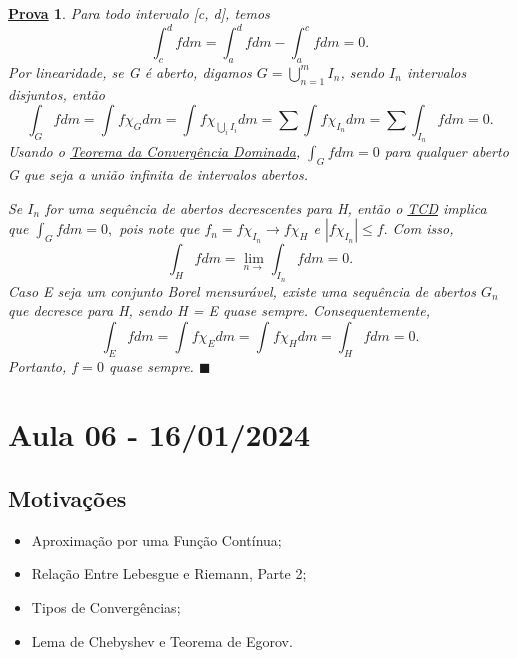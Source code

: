 \documentclass{article}
\newtheorem*{proof*}{\underline{Prova}}
\renewcommand\qedsymbol{$\blacksquare$}
\begin{document}
\begin{proof*}
  Para todo intervalo [c, d], temos 
    \[
      \int_{c}^{d}f dm = \int_{a}^{d} fdm - \int_{a}^{c} fdm = 0.
    \]
  Por linearidade, se G é aberto, digamos \(G = \bigcup_{n=1}^{m}I_{n}\), sendo \(I_{n}\) intervalos disjuntos, então 
    \[
      \int_{G}f dm = \int_{}f \chi_{G} dm = \int_{}f \chi_{\bigcup_{i}^{}I_{i}} dm = \sum\limits_{}^{}\int_{}f \chi_{I_{n}} dm = \sum\limits_{}^{}\int_{I_{n}}f dm = 0.
    \]
  Usando o \hyperlink{dominated_convergence}{Teorema da Convergência Dominada}, \(\int_{G}f dm = 0\) para qualquer aberto G que seja a união infinita de intervalos abertos. 

  Se \(I_{n}\) for uma sequência de abertos decrescentes para H, então o \hyperlink{dominated_convergence}{TCD} implica que \(\int_{G}f dm = 0,\) pois note que 
  \(f_{n} = f \chi_{I_{n}}\to f \chi_{H}\) e \(|f \chi_{I_{n}}| \leq f.\) Com isso,
    \[
      \int_{H}f dm = \lim_{n\to } \int_{I_{n}}f dm = 0.
    \]
  Caso E seja um conjunto Borel mensurável, existe uma sequência de abertos \(G_{n}\) que decresce para H, sendo H = E quase sempre. Consequentemente, 
    \[
      \int_{E}f dm = \int_{}^{}f \chi_{E} dm = \int_{}f \chi_{H} dm = \int_{H}f dm = 0.
    \]
  Portanto, \(f = 0\) quase sempre. \qedsymbol
\end{proof*}
\newpage

\section{Aula 06 - 16/01/2024}
\subsection{Motivações}
\begin{itemize}
  \item Aproximação por uma Função Contínua; 
  \item Relação Entre Lebesgue e Riemann, Parte 2;
  \item Tipos de Convergências;
  \item Lema de Chebyshev e Teorema de Egorov.
\end{itemize}
\end{document}
